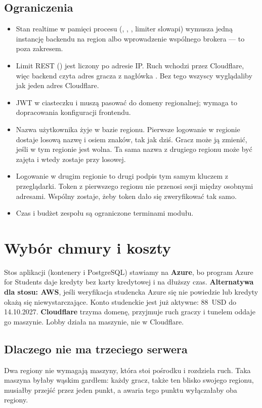 \subsection{Ograniczenia}
\begin{itemize}
  \item Stan realtime w pamięci procesu (,
        , , limiter slowapi) wymusza jedną
        instancję backendu na region albo wprowadzenie wspólnego brokera --- to
        poza zakresem.
  \item Limit REST () jest liczony po adresie IP. Ruch wchodzi
        przez Cloudflare, więc backend czyta adres gracza z nagłówka
        . Bez tego wszyscy wyglądaliby jak jeden adres
        Cloudflare.
  \item JWT w ciasteczku  i  muszą pasować do domeny
        regionalnej; wymaga to dopracowania konfiguracji frontendu.
  \item Nazwa użytkownika żyje w bazie regionu. Pierwsze logowanie w regionie
        dostaje losową nazwę  i osiem znaków, tak jak dziś. Gracz
        może ją zmienić, jeśli w tym regionie jest wolna. Ta sama nazwa z drugiego
        regionu może być zajęta i wtedy zostaje przy losowej.
  \item Logowanie w drugim regionie to drugi podpis tym samym kluczem z przeglądarki.
        Token z pierwszego regionu nie przenosi sesji między osobnymi adresami.
        Wspólny  zostaje, żeby token dało się zweryfikować tak samo.
  \item Czas i budżet zespołu są ograniczone terminami modułu.
\end{itemize}

\section{Wybór chmury i koszty}
\label{sec:wizja-chmura}
Stos aplikacji (kontenery i PostgreSQL) stawiamy na \textbf{Azure}, bo program
Azure for Students daje kredyty bez karty kredytowej i na dłuższy czas.
\textbf{Alternatywa dla stosu: AWS}, jeśli weryfikacja studencka Azure się nie
powiedzie lub kredyty okażą się niewystarczające. Konto studenckie jest już
aktywne: 88~USD do 14.10.2027. \textbf{Cloudflare} trzyma domenę, przyjmuje ruch
graczy i tunelem oddaje go maszynie. Lobby działa na maszynie, nie w Cloudflare.

\subsection{Dlaczego nie ma trzeciego serwera}
Dwa regiony nie wymagają maszyny, która stoi pośrodku i rozdziela ruch. Taka
maszyna byłaby wąskim gardłem: każdy gracz, także ten blisko swojego regionu,
musiałby przejść przez jeden punkt, a awaria tego punktu wyłączałaby oba regiony.

